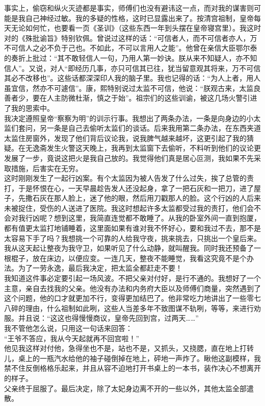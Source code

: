 事实上，偷窃和纵火灭迹都是事实，师傅们也没有避讳这一点，而对我的谋害则可能是我自己神经过敏。我的多疑的性格，这时已显露出来了。按清宫祖制，皇帝每天无论如何忙，也要看一页《圣训》（这些东西一年到头摆在皇帝寝宫里）。我这时对的《殊批谕旨》特别钦佩。曾说过这样的话：“可信者人，而不可信者亦人，万不可信人之必不负于己也。不如此，不可以言用人之能”。他曾在亲信大臣鄂尔泰的奏折上批过：“其不敢轻信人一句，乃用人第一妙诀。朕从来不知疑人，亦不知信人”。又说，对人“即经历几事，亦只可信其已往，犹当留意观其将来，万不可信其必不改移也”。这些话都深深印人我的脑子里。我也记得的话：“为人上者，用人虽宜信，然亦不可遽信”。康，熙特别说过太监不可信，他说：“朕观古来，太监良善者少，要在人主防微杜渐，慎之于始”。祖宗们的这些训谕，被这几场火警引进了我的思索中。\\

我决定遵照皇帝“察察为明”的训示行事。我想出了两条办法，一条是向身边的小太监们套问，另一条是自己去偷听太监们的谈话。后来我用第二条办法，在东西夹道太监住房窗外，发现了他们背后议论我，说我脾气越来越坏，这更引起了我的猜疑。在无逸斋发生火警这天晚上，我再到太监窗下去偷听，不料听到他们的议论更发展了一步，竟说这把火是我自己放的。我觉得他们真是居心叵测，我如果不先采取措施，后害实在无穷。\\

这时刚刚发生了一起行凶案。有个太监因为被人告发了什么过失，挨了总管的责打，于是怀恨在心，一天早晨趁告发人还没起身，拿了一把石灰和一把刀，进了屋子，先撒石灰在那人脸上，迷了他的眼，然后用刀戳那人的脸。这个行凶的人后来未被捉住，受伤的人送进了医院。我这时想起许多太监都受过我的责打，他们会不会对我行凶呢？想到这里，我简直连觉都不敢睡了。从我的卧室外间一直到抱厦，都有值更太监打地铺睡着，这里面如果有谁对我不怀好心，要和我过不去，那不是太容易下手了吗？我想挑一个可靠的人给我守夜，挑来挑去，只挑出一个皇后来。我从这天起让整夜为我守卫，如果听见了什么动静，就叫醒我。同时我还预备了一根棍子，放在床边，以便应变。一连几天，整夜不能睡觉，我看这究竟不是个办法。为了一劳永逸，最后我决定，把太监全都赶走不要！\\

我知道这件事必定要引起一场风波。不把父亲对付好，是行不通的。我想好了一个主意，亲自去找我的父亲。他没有办法和内务府大臣以及师傅们商量，突然遇到了这个问题，他的口才就更加不行，变得更加结巴了。他非常吃力地讲出了一些零七八碎的理由，什么祖制如此咧，这些人当差多年不致图谋不轨咧，等等，来进行劝服。并且说：“这这也得慢慢商议，皇帝先回到宫，过两天……”\\

我不管他怎么说，只用这一句话来回答：\\

“王爷不答应，我从今天起就再不回宫啦！”\\

他见我这样对付他，急得坐也不是，站也不是，又抓头，又挠腮，直在地上打转儿，桌上的一瓶汽水给他的袖子碰倒掉在地上，砰地一声炸了。瞅他这副模样，我禁不住反倒格格乐起来，并且从容不迫地打开书桌上的一本书，装作决心不想离开的样子。\\

父亲终于屈服了。最后决定，除了太妃身边离不开的一些以外，其他太监全部遣散。\\